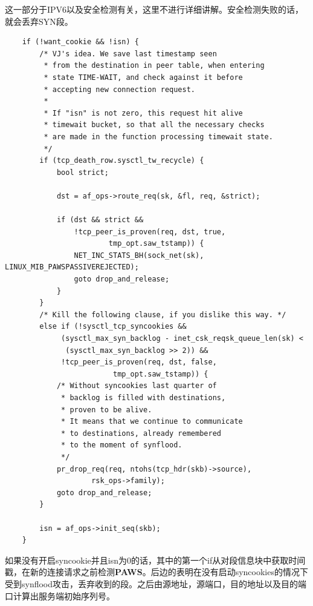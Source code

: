         这一部分于IPV6以及安全检测有关，这里不进行详细讲解。安全检测失败的话，就会丢弃SYN段。

\begin{verbatim}
    if (!want_cookie && !isn) {
        /* VJ's idea. We save last timestamp seen
         * from the destination in peer table, when entering
         * state TIME-WAIT, and check against it before
         * accepting new connection request.
         *
         * If "isn" is not zero, this request hit alive
         * timewait bucket, so that all the necessary checks
         * are made in the function processing timewait state.
         */
        if (tcp_death_row.sysctl_tw_recycle) {
            bool strict;

            dst = af_ops->route_req(sk, &fl, req, &strict);

            if (dst && strict &&
                !tcp_peer_is_proven(req, dst, true,
                        tmp_opt.saw_tstamp)) {
                NET_INC_STATS_BH(sock_net(sk), LINUX_MIB_PAWSPASSIVEREJECTED);
                goto drop_and_release;
            }
        }
        /* Kill the following clause, if you dislike this way. */
        else if (!sysctl_tcp_syncookies &&
             (sysctl_max_syn_backlog - inet_csk_reqsk_queue_len(sk) <
              (sysctl_max_syn_backlog >> 2)) &&
             !tcp_peer_is_proven(req, dst, false,
                         tmp_opt.saw_tstamp)) {
            /* Without syncookies last quarter of
             * backlog is filled with destinations,
             * proven to be alive.
             * It means that we continue to communicate
             * to destinations, already remembered
             * to the moment of synflood.
             */
            pr_drop_req(req, ntohs(tcp_hdr(skb)->source),
                    rsk_ops->family);
            goto drop_and_release;
        }

        isn = af_ops->init_seq(skb);
    }
\end{verbatim}

        如果没有开启syncookie并且isn为0的话，其中的第一个if从对段信息块中获取时间戳，在新的连接请求之前检测\textbf{PAWS}。后边的表明在没有启动syncookies的情况下受到synflood攻击，丢弃收到的段。之后由源地址，源端口，目的地址以及目的端口计算出服务端初始序列号。

